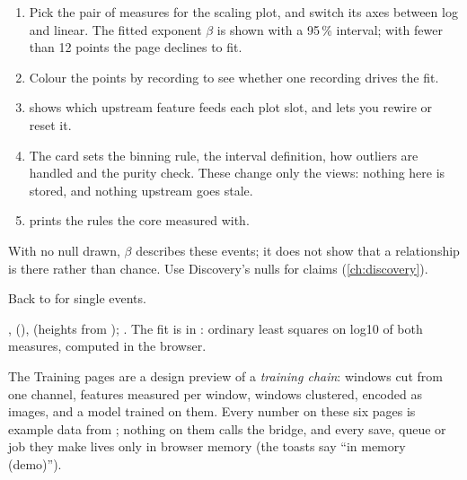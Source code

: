 \begin{enumerate}
  \item Pick the pair of measures for the scaling plot, and switch its axes between log and
        linear. The fitted exponent \(\beta\) is shown with a 95\,\% interval; with fewer than 12
        points the page declines to fit.
  \item Colour the points by recording to see whether one recording drives the fit.
  \item {} shows which upstream feature feeds each plot slot, and lets you
        rewire or reset it.
  \item The  card sets the binning rule, the interval definition, how outliers are
        handled and the purity check. These change only the views: nothing here is stored, and
        nothing upstream goes stale.
  \item {} prints the rules the core measured with.
\end{enumerate}

\begin{watchout}
With no null drawn, \(\beta\) describes these events; it does not show that a relationship is
there rather than chance. Use Discovery's nulls for claims (\cref{ch:discovery}).
\end{watchout}

Back to  for single events.

\begin{underthehood}
,  (),
 (heights from );
. The fit is  in
: ordinary least squares on log10 of both
measures, computed in the browser.
\end{underthehood}

The Training pages are a design preview of a \emph{training chain}: windows cut from one channel,
features measured per window, windows clustered, encoded as images, and a model trained on them.
Every number on these six pages is example data from ;
nothing on them calls the bridge, and every save, queue or job they make lives only in browser
memory (the toasts say ``in memory (demo)'').

